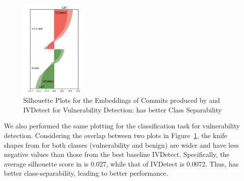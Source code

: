 \begin{figure}[t]
	\centering
	\includegraphics[width=1.3in]{graphs/plot-vd}
       \vspace{-6pt}
	\caption{Silhouette Plots for the Embeddings of Commits produced by {\tool} and IVDetect for Vulnerability Detection: {\tool} has better Class Separability}
	\label{fig:vd}
\end{figure}

We also performed the same plotting for the classification task for
vulnerability detection. Considering the overlap between two plots in
Figure~\ref{fig:vd}, the knife shapes from {\tool} for both classes
(vulnerability and benign) are wider and have less negative values
than those from the best baseline IVDetect. Specifically, the average
silhouette score in {\tool} is 0.027, while that of IVDetect is
0.0072. Thus, {\tool} has better class-separability, leading to better
performance.
